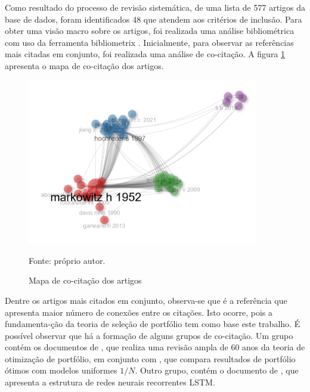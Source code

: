         \ipar Como resultado do processo de revisão sistemática, de uma lista de 577 artigos da base de dados, foram identificados 48 que atendem aos critérios de inclusão. Para obter uma visão macro sobre os artigos, foi realizada uma análise bibliométrica com uso da ferramenta bibliometrix \cite{aria2017bibliometrix}. Inicialmente, para observar as referências mais citadas em conjunto, foi realizada uma análise de co-citação. A figura \ref{fig:co_citacao} apresenta o mapa de co-citação dos artigos.

        \begin{figure}[htbp]
            \centering
            \caption{Mapa de co-citação dos artigos}
            \label{fig:co_citacao}
            \includegraphics[width=0.9\textwidth]{./imagens/cocitation_network.png}
            \par \footnotesize Fonte: próprio autor.
        \end{figure}

        \ipar Dentre os artigos mais citados em conjunto, observa-se que  é a referência que apresenta maior número de conexões entre os citações. Isto ocorre, pois a fundamenta-ção da teoria de seleção de portfólio tem como base este trabalho. É possível observar que há a formação de alguns grupos de co-citação. Um grupo contém os documentos de , que realiza uma revisão ampla de 60 anos da teoria de otimização de portfólio, em conjunto com , que compara resultados de portfólio ótimos com modelos uniformes $1/N$. Outro grupo, contém o documento de , que apresenta a estrutura de redes neurais recorrentes \acrshort{LSTM}.
        
